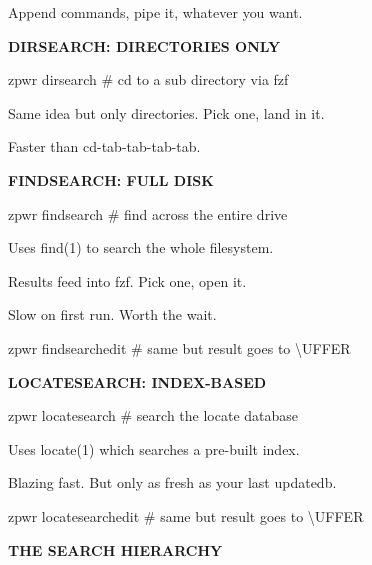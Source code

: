 \documentclass[11pt,a4paper,twoside]{book}
\begin{document}
Append commands, pipe it, whatever you want.


\vspace{12pt}
{\bfseries\color{neonyellow} DIRSEARCH: DIRECTORIES ONLY}\vspace{4pt}

\begin{codebox}
zpwr dirsearch           \# cd to a sub directory via fzf\\
\end{codebox}

Same idea but only directories. Pick one, land in it.

Faster than cd-tab-tab-tab-tab.


\vspace{12pt}
{\bfseries\color{neonyellow} FINDSEARCH: FULL DISK}\vspace{4pt}

\begin{codebox}
zpwr findsearch          \# find across the entire drive\\
\end{codebox}

Uses find(1) to search the whole filesystem.

Results feed into fzf. Pick one, open it.

Slow on first run. Worth the wait.

\begin{codebox}
zpwr findsearchedit      \# same but result goes to \textbackslash{}UFFER\\
\end{codebox}


\vspace{12pt}
{\bfseries\color{neonyellow} LOCATESEARCH: INDEX-BASED}\vspace{4pt}

\begin{codebox}
zpwr locatesearch        \# search the locate database\\
\end{codebox}

Uses locate(1) which searches a pre-built index.

Blazing fast. But only as fresh as your last updatedb.

\begin{codebox}
zpwr locatesearchedit    \# same but result goes to \textbackslash{}UFFER\\
\end{codebox}


\vspace{12pt}
{\bfseries\color{neonyellow} THE SEARCH HIERARCHY}\vspace{4pt}
\end{document}
